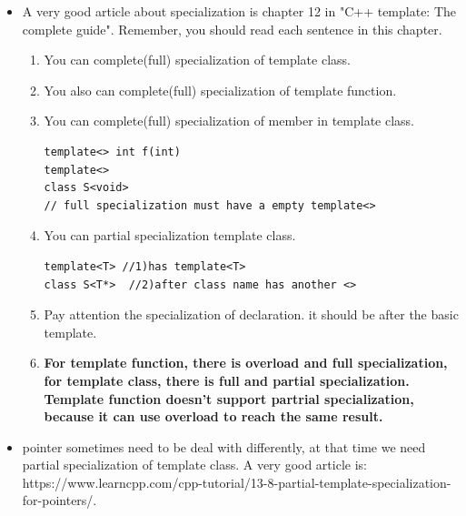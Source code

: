 \documentclass[a4paper,11pt,twoside]{book}
\begin{document}
\begin{itemize}
\item A very good article about specialization is chapter 12 in "C++ template: The complete guide". Remember, you should read each sentence in this chapter.
\begin{enumerate}
	\item You can complete(full) specialization of template class. 
	\item You also can complete(full) specialization of template function. 
	\item You can complete(full) specialization of member in template class. 
\begin{lstlisting}
template<> int f(int)
template<> 
class S<void>
// full specialization must have a empty template<>
\end{lstlisting}
	\item You can partial specialization template class.
\begin{lstlisting}
template<T> //1)has template<T>
class S<T*>  //2)after class name has another <>
\end{lstlisting}
	\item Pay attention the specialization of declaration. it should be after the basic template.
	\item \textbf{For template function, there is overload and full specialization, for template class, there is full and partial specialization. Template function doesn't support partrial specialization, because it can use overload to reach the same result.} 
\end{enumerate}

		\item pointer sometimes need to be deal with differently, at that time we need partial specialization of template class. A very good article is:\\ https://www.learncpp.com/cpp-tutorial/13-8-partial-template-specialization-for-pointers/. 
\end{itemize}
\end{document}
